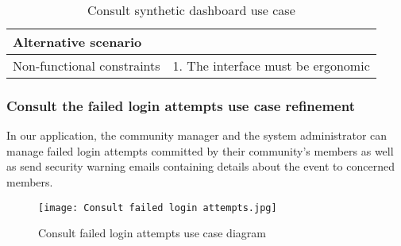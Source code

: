 \begin{table}[H]
\begin{tabular}{|ll|}
\multicolumn{1}{|l|}{Alternative scenario}       &                                                                                                                                                                           \\ \hline
\multicolumn{1}{|l|}{Non-functional constraints} & 1. The interface must be ergonomic                                                                                                                                        \\ \hline
\end{tabular}
\caption{Consult synthetic dashboard use case}
\end{table}
\subsubsection{Consult the failed login attempts use case refinement}
In our application, the community manager and the system administrator can manage failed login attempts committed by their community's members as well as send security warning emails containing details about the event to concerned members.\\
\begin{figure}[H]%
    \center   
    \texttt{[image: Consult failed login attempts.jpg]}
    \caption{Consult failed login attempts use case diagram}
\end{figure}

